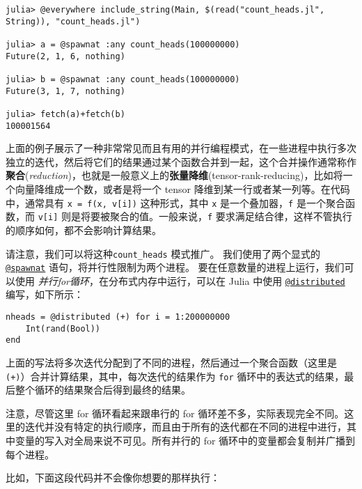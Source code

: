 \begin{verbatim}
julia> @everywhere include_string(Main, $(read("count_heads.jl", String)), "count_heads.jl")

julia> a = @spawnat :any count_heads(100000000)
Future(2, 1, 6, nothing)

julia> b = @spawnat :any count_heads(100000000)
Future(3, 1, 7, nothing)

julia> fetch(a)+fetch(b)
100001564
\end{verbatim}



上面的例子展示了一种非常常见而且有用的并行编程模式，在一些进程中执行多次独立的迭代，然后将它们的结果通过某个函数合并到一起，这个合并操作通常称作\textbf{聚合}(\emph{reduction})，也就是一般意义上的\textbf{张量降维}(tensor-rank-reducing)，比如将一个向量降维成一个数，或者是将一个 tensor 降维到某一行或者某一列等。在代码中，通常具有 \texttt{x = f(x, v[i])} 这种形式，其中 \texttt{x} 是一个叠加器，\texttt{f} 是一个聚合函数，而 \texttt{v[i]} 则是将要被聚合的值。一般来说，\texttt{f} 要求满足结合律，这样不管执行的顺序如何，都不会影响计算结果。



请注意，我们可以将这种\texttt{count\_heads} 模式推广。 我们使用了两个显式的 \hyperlink{11231712027010946923}{\texttt{@spawnat}} 语句，将并行性限制为两个进程。 要在任意数量的进程上运行，我们可以使用 \emph{并行for循环}，在分布式内存中运行，可以在 Julia 中使用 \hyperlink{4581929266257108937}{\texttt{@distributed}} 编写，如下所示：




\begin{verbatim}
nheads = @distributed (+) for i = 1:200000000
    Int(rand(Bool))
end
\end{verbatim}



上面的写法将多次迭代分配到了不同的进程，然后通过一个聚合函数（这里是 \texttt{(+)}）合并计算结果，其中，每次迭代的结果作为 \texttt{for} 循环中的表达式的结果，最后整个循环的结果聚合后得到最终的结果。



注意，尽管这里 for 循环看起来跟串行的 for 循环差不多，实际表现完全不同。这里的迭代并没有特定的执行顺序，而且由于所有的迭代都在不同的进程中进行，其中变量的写入对全局来说不可见。所有并行的 for 循环中的变量都会复制并广播到每个进程。



比如，下面这段代码并不会像你想要的那样执行：




